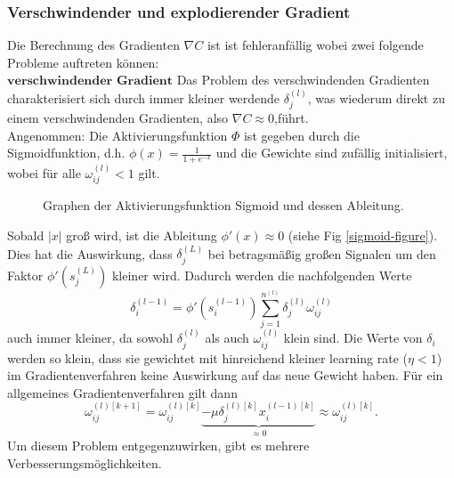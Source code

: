 \subsubsection{Verschwindender und explodierender Gradient}
Die Berechnung des Gradienten $\nabla C$ ist ist fehleranfällig wobei zwei folgende Probleme auftreten können: \\
$\textbf{verschwindender Gradient}$
Das Problem des verschwindenden Gradienten charakterisiert sich durch immer kleiner werdende $\delta_j^{(l)}$, was wiederum
direkt zu einem verschwindenden Gradienten, also $\nabla C \approx 0$,führt. \\
Angenommen: Die Aktivierungsfunktion $\Phi$ ist gegeben durch die Sigmoidfunktion, d.h. $\phi(x) =\frac{1}{1+e^{-x}}$ und
die Gewichte sind zufällig initialisiert, wobei für alle $\omega_{ij}^{(l)}<1$ gilt.\\
\begin{figure}
    \begin{center}
        \caption{Graphen der Aktivierungsfunktion Sigmoid und dessen Ableitung.}
        \label{sigmoid-figure}
    \end{center}
\end{figure}
Sobald $|x|$ groß wird, ist die Ableitung $\phi'(x) \approx 0$ (siehe Fig \eqref{sigmoid-figure}). Dies hat die Auswirkung, dass
$\delta_j^{(L)}$ bei betragsmäßig großen Signalen um den Faktor $\phi'(s_j^{(L)})$ kleiner wird. Dadurch werden die
nachfolgenden Werte
\[
    \delta_i^{(l-1)}=\phi'(s_i^{(l-1)})\sum\limits_{j=1}^{n^{(l)}}\delta_j^{(l)} \omega_{ij}^{(l)}
\]
auch immer kleiner, da sowohl $\delta_j^{(l)}$ als auch $\omega_{ij}^{(l)}$ klein sind. Die Werte von $\delta_i$ werden
so klein, dass sie gewichtet mit hinreichend kleiner learning rate ($\eta <1$) im Gradientenverfahren keine Auswirkung
auf das neue Gewicht haben. Für ein allgemeines Gradientenverfahren gilt dann
\[
    \omega_{ij}^{(l)[k+1]} = \omega_{ij}^{(l)[k]}\underbrace{-\mu \delta_j^{(l)[k]}x_i^{(l-1)[k]}}_{\approx 0}\approx \omega_{ij}^{(l)[k]}.
\]
Um diesem Problem entgegenzuwirken, gibt es mehrere Verbesserungsmöglichkeiten.\newline
